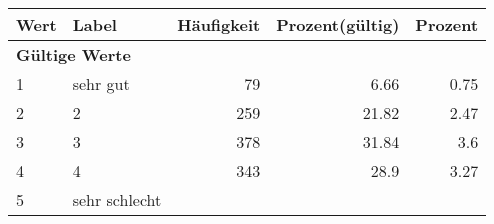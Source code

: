      \begin{longtable}{lXrrr}
     \toprule
     \textbf{Wert} & \textbf{Label} & \textbf{Häufigkeit} & \textbf{Prozent(gültig)} & \textbf{Prozent} \\
     \endhead
     \midrule
     \multicolumn{5}{l}{\textbf{Gültige Werte}}\\

     1 &
     \multicolumn{1}{X}{ sehr gut   } &


       \num{79} &
       \num[round-mode=places,round-precision=2]{6.66} &
         \num[round-mode=places,round-precision=2]{0.75} \\

     2 &
     \multicolumn{1}{X}{ 2   } &


       \num{259} &
       \num[round-mode=places,round-precision=2]{21.82} &
         \num[round-mode=places,round-precision=2]{2.47} \\

     3 &
     \multicolumn{1}{X}{ 3   } &


       \num{378} &
       \num[round-mode=places,round-precision=2]{31.84} &
         \num[round-mode=places,round-precision=2]{3.6} \\

     4 &
     \multicolumn{1}{X}{ 4   } &


       \num{343} &
       \num[round-mode=places,round-precision=2]{28.9} &
         \num[round-mode=places,round-precision=2]{3.27} \\

     5 &
     \multicolumn{1}{X}{ sehr schlecht   } &



\end{longtable}

